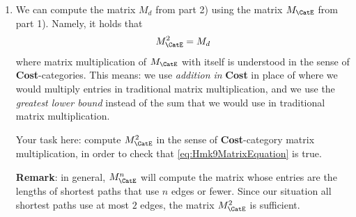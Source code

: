 \begin{gradedexercise}
\begin{enumerate}
              They also define a generalized (Lawvere) metric~$d$
              \begin{equation}
                  d \colon \Ob_\CatE \cartprod \Ob_\CatE \longrightarrow [0, \infty],
              \end{equation}
              if, for any $x, y \setin \Ob_\CatE$, we let $d(x, y) \setin [0, \infty]$ be the length of the shortest path in the weighted graph from $x$ to $y$ (summing lengths).
              The function $d: \Ob_\CatE \cartprod \Ob_\CatE \sto [0, \infty]$ also defines a matrix, call it $M_d$.

              Your task here: write down the table for this matrix $M_d$.

        \item We can compute the matrix $M_d$ from part 2) using the matrix $M_\CatE$  from part 1).
              Namely, it holds that
              \begin{equation}\label{eq:Hmk9MatrixEquation}
                  M_\CatE^2 = M_d
              \end{equation}
              where matrix multiplication of $M_\CatE$ with itself is understood in the sense of \textbf{Cost}-categories.
              This means: we use \emph{addition in} \textbf{Cost} in place of where we would multiply entries in traditional matrix multiplication, and we use the \emph{greatest lower bound} instead of the sum that we would use in traditional matrix multiplication.

              Your task here: compute $M_\CatE^2$ in the sense of \textbf{Cost}-category matrix multiplication, in order to check that \cref{eq:Hmk9MatrixEquation} is true.

              \textbf{Remark}: in general, $M_\CatE^n$ will compute the matrix whose entries are the lengths of shortest paths that use $n$ edges or fewer.
              Since our situation all shortest paths use at most $2$ edges, the matrix $M_\CatE^2$ is sufficient.
    \end{enumerate}
\end{gradedexercise}

